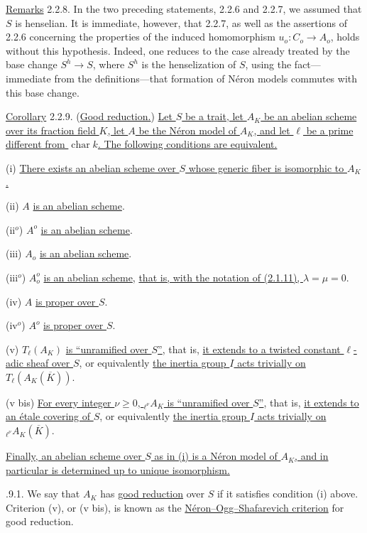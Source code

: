 \medskip
\noindent
\underline{Remarks} 2.2.8. In the two preceding statements, 2.2.6 and
2.2.7, we assumed that $S$ is henselian.  It is immediate, however,
that 2.2.7, as well as the assertions of 2.2.6 concerning the
properties of the induced homomorphism
$u_o:C_o\longrightarrow A_o$, holds without this hypothesis.  Indeed,
one reduces to the case already treated by the base change
$S^h\longrightarrow S$, where $S^h$ is the henselization of $S$, using
the fact---immediate from the definitions---that formation of N\'{e}ron
models commutes with this base change.

\medskip
\noindent
\underline{Corollary} 2.2.9. (\underline{Good reduction.})
\underline{Let $S$ be a trait, let $A_K$ be an abelian scheme over its
fraction field $K$, let $A$ be the N\'{e}ron model of $A_K$, and let
$\ell$ be a prime different from $\operatorname{char}k$.  The following
conditions are equivalent.}

\smallskip
\noindent
(i) \underline{There exists an abelian scheme over $S$ whose generic
fiber is isomorphic to $A_K$.}

\noindent
(ii) $A$ \underline{is an abelian scheme}.

\noindent
(ii$^o$) $A^o$ \underline{is an abelian scheme}.

\noindent
(iii) $A_o$ \underline{is an abelian scheme}.

\noindent
(iii$^o$) $A_o^o$ \underline{is an abelian scheme}, \underline{that is,
with the notation of (2.1.11), $\lambda=\mu=0$}.

\noindent
(iv) $A$ \underline{is proper over $S$}.

\noindent
(iv$^o$) $A^o$ \underline{is proper over $S$}.

\noindent
(v) $T_\ell(A_K)$ \underline{is ``unramified over $S$''}, that is,
\underline{it extends to a twisted constant $\ell$-adic sheaf over
$S$}, or equivalently \underline{the inertia group $I$ acts trivially
on $T_\ell(A_K(\overline K))$}.

\noindent
(v bis) \underline{For every integer $\nu\geq0$,
${}_{\ell^\nu}A_K$ is ``unramified over $S$''}, that is,
\underline{it extends to an \'{e}tale covering of $S$}, or equivalently
\underline{the inertia group $I$ acts trivially on
${}_{\ell^\nu}A_K(\overline K)$}.

\smallskip
\noindent
\underline{Finally, an abelian scheme over $S$ as in (i) is a N\'{e}ron
model of $A_K$, and in particular is determined up to unique
isomorphism.}

\medskip
{}.9.1. We say that $A_K$ has \underline{good reduction} over $S$ if
it satisfies condition (i) above.  Criterion (v), or (v bis), is known
as the \underline{N\'{e}ron--Ogg--Shafarevich criterion} for good
reduction.

